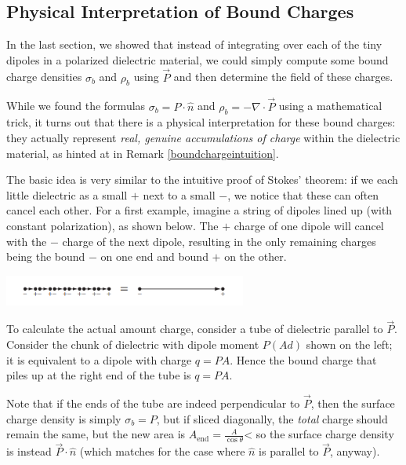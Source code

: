 \subsection{Physical Interpretation of Bound Charges}

In the last section, we showed that instead of integrating over each of the tiny dipoles in a polarized dielectric material, we could simply compute some bound charge densities $\sigma_b$ and $\rho_b$ using $\vec{P}$ and then determine the field of these charges.

While we found the formulas $\sigma_b=P\cdot \hat{n}$ and $\rho_b=-\nabla\cdot \vec{P}$ using a mathematical trick, it turns out that there is a physical interpretation for these bound charges: they actually represent \textit{real, genuine accumulations of charge} within the dielectric material, as hinted at in Remark \ref{boundchargeintuition}.

The basic idea is very similar to the intuitive proof of Stokes' theorem: if we each little dielectric as a small $+$ next to a small $-$, we notice that these can often cancel each other. For a first example, imagine a string of dipoles lined up (with constant polarization), as shown below. The $+$ charge of one dipole will cancel with the $-$ charge of the next dipole, resulting in the only remaining charges being the bound $-$ on one end and bound $+$ on the other.

\begin{center}
    \includegraphics[width=8cm]{Electrodynamics/images/fig4.11.PNG}
\end{center}

To calculate the actual amount charge, consider a tube of dielectric parallel to $\vec{P}$. Consider the chunk of dielectric with dipole moment $P(Ad)$ shown on the left; it is equivalent to a dipole with charge $q=PA$. Hence the bound charge that piles up at the right end of the tube is $q=PA$.

Note that if the ends of the tube are indeed perpendicular to $\vec{P}$, then the surface charge density is simply $\sigma_b=P$, but if sliced diagonally, the \textit{total} charge should remain the same, but the new area is $A_{\text{end}}=\frac{A}{\cos\theta}$< so the surface charge density is instead $\vec{P}\cdot \hat{n}$ (which matches for the case where $\hat{n}$ is parallel to $\vec{P}$, anyway). 


